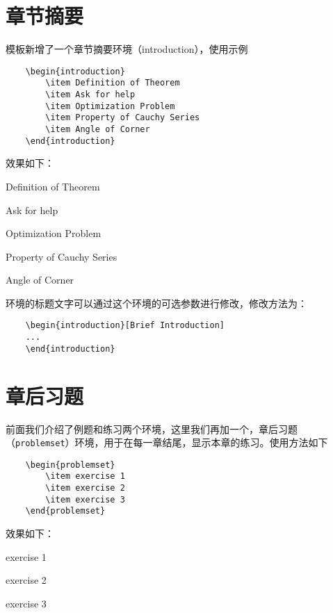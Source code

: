 	\section{章节摘要}
	模板新增了一个章节摘要环境（introduction），使用示例
	\begin{lstlisting}
	\begin{introduction}
		\item Definition of Theorem
		\item Ask for help
		\item Optimization Problem
		\item Property of Cauchy Series
		\item Angle of Corner
	\end{introduction}
	\end{lstlisting}
	效果如下：
	\begin{introduction}
		\item Definition of Theorem
		\item Ask for help
		\item Optimization Problem
		\item Property of Cauchy Series
		\item Angle of Corner
	\end{introduction}
	
	环境的标题文字可以通过这个环境的可选参数进行修改，修改方法为：
	\begin{lstlisting}
	\begin{introduction}[Brief Introduction]
	...
	\end{introduction}
	\end{lstlisting}
	
	
	\section{章后习题}
	前面我们介绍了例题和练习两个环境，这里我们再加一个，章后习题（\lstinline{problemset}）环境，用于在每一章结尾，显示本章的练习。使用方法如下
	
	\begin{lstlisting}
	\begin{problemset}
		\item exercise 1
		\item exercise 2
		\item exercise 3
	\end{problemset}
	\end{lstlisting}
	
	
	效果如下：
	\begin{problemset}
		\item exercise 1
		\item exercise 2
		\item exercise 3
	\end{problemset}
	
